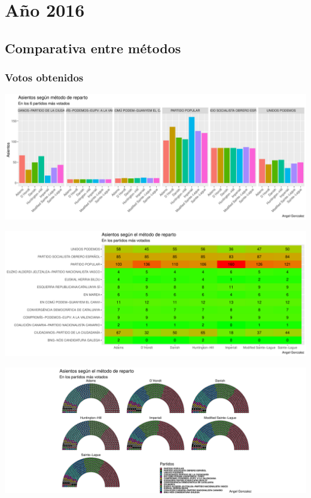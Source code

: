 \documentclass[12pt,a4paper,]{book}
\numberwithin{dummy}{section}
\theoremstyle{ocrenumbox}
\theoremstyle{blacknumex}
\theoremstyle{blacknumbox}
\theoremstyle{ocrenum}
\theoremstyle{ocrenum}
\begin{document}
\hypertarget{auxf1o-2016}{%
\section{Año 2016}\label{auxf1o-2016}}

\hypertarget{comparativa-entre-muxe9todos-12}{%
\subsection{Comparativa entre
métodos}\label{comparativa-entre-muxe9todos-12}}

\hypertarget{votos-obtenidos-12}{%
\subsubsection{Votos obtenidos}\label{votos-obtenidos-12}}

\begin{center}\includegraphics[width=0.95\linewidth]{figurasR/unnamed-chunk-167-1} \end{center}

\begin{center}\includegraphics[width=0.95\linewidth]{figurasR/unnamed-chunk-167-2} \end{center}

\begin{center}\includegraphics[width=0.95\linewidth]{figurasR/unnamed-chunk-167-3} \end{center}
\end{document}
